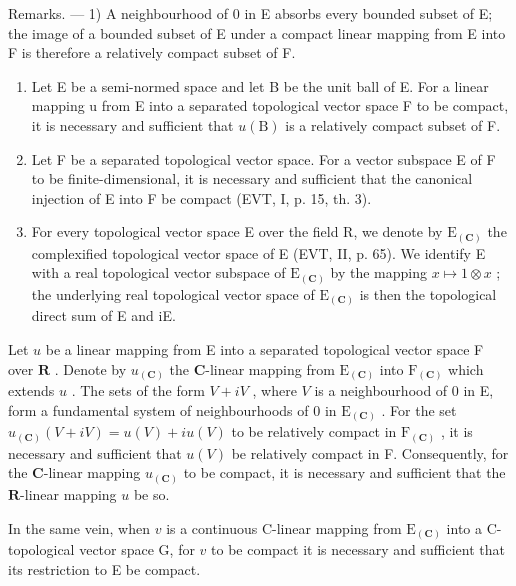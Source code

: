 Remarks. --- 1) A neighbourhood of 0 in E absorbs every bounded subset of E; the image of a bounded subset of E under a compact linear mapping from E into F is therefore a relatively compact subset of F.

\begin{enumerate}
\def\labelenumi{\arabic{enumi})}
\setcounter{enumi}{1}
\item
  Let E be a semi-normed space and let B be the unit ball of E. For a linear mapping u from E into a separated topological vector space F to be compact, it is necessary and sufficient that \(u(\mathrm{B})\) is a relatively compact subset of F.
\item
  Let F be a separated topological vector space. For a vector subspace E of F to be finite-dimensional, it is necessary and sufficient that the canonical injection of E into F be compact (EVT, I, p. 15, th. 3).
\item
  For every topological vector space E over the field R, we denote by \(\mathrm{E}_{(\mathbf{C})}\) the complexified topological vector space of E (EVT, II, p. 65). We identify E with a real topological vector subspace of \(\mathrm{E}_{(\mathbf{C})}\) by the mapping \(x \mapsto 1 \otimes x\) ; the underlying real topological vector space of \(\mathrm{E}_{(\mathbf{C})}\) is then the topological direct sum of E and iE.
\end{enumerate}

Let \(u\) be a linear mapping from E into a separated topological vector space F over \(\mathbf{R}\) . Denote by \(u_{(\mathbf{C})}\) the \(\mathbf{C}\)-linear mapping from \(\mathrm{E}_{(\mathbf{C})}\) into \(\mathrm{F}_{(\mathbf{C})}\) which extends \(u\) . The sets of the form \(V + iV\) , where \(V\) is a neighbourhood of 0 in E, form a fundamental system of neighbourhoods of 0 in \(\mathrm{E}_{(\mathbf{C})}\) . For the set \(u_{(\mathbf{C})}(V + iV) = u(V) + iu(V)\) to be relatively compact in \(\mathrm{F}_{(\mathbf{C})}\) , it is necessary and sufficient that \(u(V)\) be relatively compact in F. Consequently, for the \(\mathbf{C}\)-linear mapping \(u_{(\mathbf{C})}\) to be compact, it is necessary and sufficient that the \(\mathbf{R}\)-linear mapping \(u\) be so.

In the same vein, when \(v\) is a continuous C-linear mapping from \(\mathrm{E}_{(\mathbf{C})}\) into a C-topological vector space G, for \(v\) to be compact it is necessary and sufficient that its restriction to E be compact.

